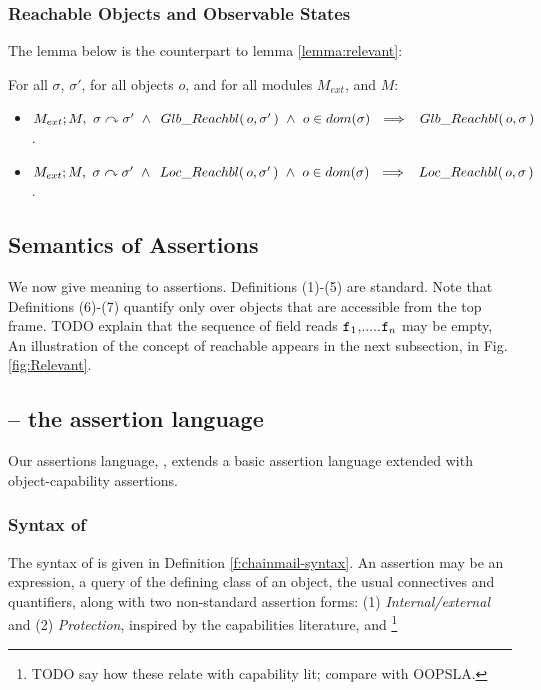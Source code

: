\subsubsection{{Reachable  Objects and Observable States}}


The lemma below is the counterpart to lemma \ref{lemma:relevant}:

\begin{lemma}
For all $\sigma$, $\sigma'$, for all objects $o$, and for all modules $M_{ext}$, and $M$:
\begin{itemize}
\item
$M_{ext} ; M,\ \sigma \curvearrowright \sigma' \ \wedge \  \,Glb\_Reachbl(\,o,\sigma'\,) \ \wedge \ o\in dom(\sigma) \ \ \Longrightarrow \ \  \,Glb\_Reachbl(\,o,\sigma\,)$.
\item
$M_{ext} ; M,\ \sigma \curvearrowright \sigma' \ \wedge \    \,Loc\_Reachbl(\,o,\sigma'\,)\   \wedge \ o\in dom(\sigma) \ \ \Longrightarrow \ \  \,Loc\_Reachbl(\,o,\sigma\,)$.
\end{itemize}
\end{lemma}

\subsection{Semantics of Assertions}

We now give meaning to assertions. Definitions (1)-(5) are standard. Note that Definitions (6)-(7) quantify only over objects that are accessible from the top frame. TODO  explain that the sequence of field reads ${\texttt{f}}_1$,.....${\texttt{f}}_n$ may be empty,
An illustration of the concept of reachable appears in the next subsection, in Fig. \ref{fig:Relevant}.

 

\subsection{\AssertLang -- the assertion language}
\label{sub:SpecO}

Our assertions language, \AssertLang, extends a 
 basic assertion language extended with
object-capability assertions. 


\subsubsection{Syntax of \AssertLang}
The syntax of \AssertLang   is given in
Definition \ref{f:chainmail-syntax}.
An assertion may be an expression,   a query of the defining class of
  an object, the usual connectives and quantifiers, along 
with two non-standard assertion forms:
(1) \emph{Internal/external} and (2) \emph{Protection}, inspired by the capabilities literature, and
\footnote{{ TODO say how these relate with capability lit;  compare with 
 OOPSLA.}}


